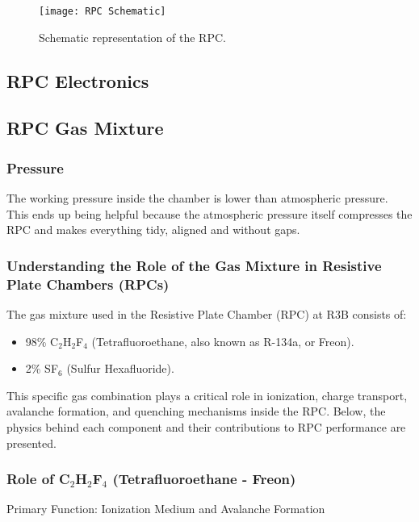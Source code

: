 \begin{figure}
	\texttt{[image: RPC Schematic]}
	\caption{Schematic representation of the RPC.}
	\label{fig:RPCScheme}
\end{figure}

\subsection{RPC Electronics}

\subsection{RPC Gas Mixture}

\subsubsection{Pressure}

The working pressure inside the chamber is lower than atmospheric pressure. This ends up being helpful because the atmospheric pressure itself compresses the RPC and makes everything tidy, aligned and without gaps.


\subsubsection{Understanding the Role of the Gas Mixture in Resistive Plate Chambers (RPCs)}

The gas mixture used in the Resistive Plate Chamber (RPC) at R3B consists of:

\begin{itemize}
	\item 98\% C$_2$H$_2$F$_4$ (Tetrafluoroethane, also known as R-134a, or Freon).
	\item 2\% SF$_6$ (Sulfur Hexafluoride).
\end{itemize}


This specific gas combination plays a critical role in ionization, charge transport, avalanche formation, and quenching mechanisms inside the RPC. Below, the physics behind each component and their contributions to RPC performance are presented.


\subsubsection{Role of C$_2$H$_2$F$_4$ (Tetrafluoroethane - Freon)}

Primary Function: Ionization Medium and Avalanche Formation

